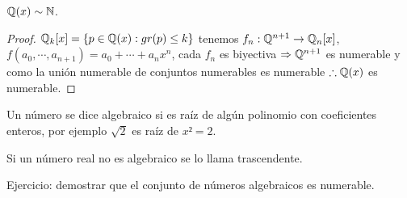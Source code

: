 \begin{eg}
    $\mathbb{Q}(x) \sim \mathbb{N}$.
    \begin{proof}
        $\mathbb{Q}_k[x] = \{ p \in \mathbb{Q}(x) : gr(p) \leq k \}$ tenemos $f_n : \mathbb{Q}^{n+1} \to \mathbb{Q}_n[x]$, $f(a_0, \cdots, a_{n+1}) = a_0 + \cdots + a_nx^n$, cada $f_n$ es biyectiva $\Rightarrow \mathbb{Q}^{n+1}$ es numerable y como la unión numerable de conjuntos numerables es numerable $\therefore \mathbb{Q}(x)$ es numerable.
    \end{proof}
\end{eg}

\begin{definition}
    Un número se dice algebraico si es raíz de algún polinomio con coeficientes enteros, por ejemplo $\sqrt{2}$ es raíz de $x² = 2$.
\end{definition}

\begin{definition}
    Si un número real no es algebraico se lo llama trascendente.
\end{definition}

Ejercicio: demostrar que el conjunto de números algebraicos es numerable.
